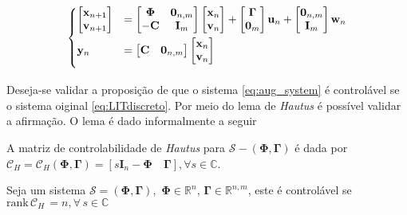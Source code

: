     \begin{equation}
        \begin{dcases}
            \begin{bmatrix} \mathbf{x}_{n+1} \\ \mathbf{v}_{n+1}\end{bmatrix} &= \begin{bmatrix} \mathbf{\Phi} & \mathbf{0}_{n, m} \\ -\mathbf{C} & \mathbf{I}_m \end{bmatrix} \begin{bmatrix} \mathbf{x}_{n} \\ \mathbf{v}_{n}\end{bmatrix} + \begin{bmatrix} \mathbf{\Gamma} \\ \mathbf{0}_{m}\end{bmatrix} \mathbf{u}_{n} + \begin{bmatrix} \mathbf{0}_{n, m} \\ \mathbf{I}_{m}\end{bmatrix} \mathbf{w}_{n} \\ 
            \mathbf{y}_{n} &= \begin{bmatrix} \mathbf{C} & \mathbf{0}_{n, m} \end{bmatrix} \vspace{5pt} \begin{bmatrix} \mathbf{x}_{n} \\ \mathbf{v}_{n}\end{bmatrix}
            \label{eq:aug_system}
        \end{dcases}
    \end{equation}

Deseja-se validar a proposição de que o sistema \eqref{eq:aug_system} é controlável se o sistema oiginal \eqref{eq:LITdiscreto}. Por meio do lema de \emph{Hautus} \cite[1, pg. 5]{mehrgroessen_2013} é possível validar a afirmação. O lema é dado informalmente a seguir

    \begin{definition}
        A matriz de controlabilidade de \emph{Hautus} para $\mathcal{S} - (\mathbf{\Phi}, \mathbf{\Gamma})$ é dada por $\mathcal{C}_H = \mathcal{C}_H(\mathbf{\Phi}, \mathbf{\Gamma}) = \left[ s \mathbf{I}_n - \mathbf{\Phi} \quad \mathbf{\Gamma} \right], \forall s \in \mathbb{C}$.
    \end{definition}

    \begin{lemma}
        \label{lemma:hautus}
        Seja um sistema $\mathcal{S} = (\mathbf{\Phi}, \mathbf{\Gamma}), $ $\mathbf{\Phi} \in \mathbb{R}^{n}$, $\mathbf{\Gamma} \in \mathbb{R}^{n, m}$, este é controlável se $\mathrm{rank} \, \mathcal{C}_H \, = n, \forall \, s \in \mathbb{C}$
    \end{lemma}

